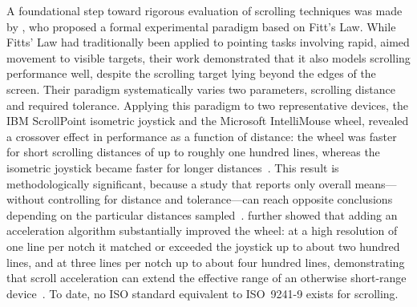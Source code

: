 A foundational step toward rigorous evaluation of scrolling techniques was made by \citeauthor{hinckley2002quantitative}, who proposed a formal experimental paradigm based on Fitt's Law. While Fitts' Law had traditionally been applied to pointing tasks involving rapid, aimed movement to visible targets, their work demonstrated that it also models scrolling performance well, despite the scrolling target lying beyond the edges of the screen. Their paradigm systematically varies two parameters, scrolling distance and required tolerance. Applying this paradigm to two representative devices, the IBM ScrollPoint isometric joystick and the Microsoft IntelliMouse wheel, revealed a crossover effect in performance as a function of distance: the wheel was faster for short scrolling distances of up to roughly one hundred lines, whereas the isometric joystick became faster for longer distances~\cite{hinckley2002quantitative}. This result is methodologically significant, because a study that reports only overall means---without controlling for distance and tolerance---can reach opposite conclusions depending on the particular distances sampled~\cite{hinckley2002quantitative}. \citeauthor{hinckley2002quantitative} further showed that adding an acceleration algorithm substantially improved the wheel: at a high resolution of one line per notch it matched or exceeded the joystick up to about two hundred lines, and at three lines per notch up to about four hundred lines, demonstrating that scroll acceleration can extend the effective range of an otherwise short-range device~\cite{hinckley2002quantitative}. To date, no ISO standard equivalent to ISO~9241-9 exists for scrolling. 

